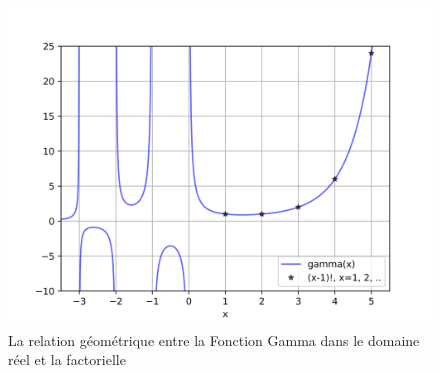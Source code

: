 \begin{figure}[H]
    \centering
    \includegraphics[scale = 0.7]{IMAGES/gamma.png}
    \caption{La relation géométrique entre la Fonction Gamma dans le domaine réel et la factorielle}
    \label{fig:gamma_fact}
\end{figure}


